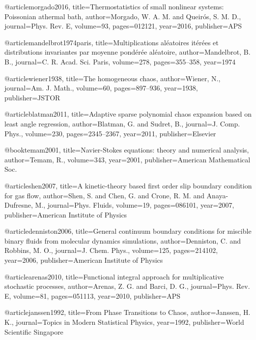 @article{morgado2016,
  title={{Thermostatistics of small nonlinear systems: Poissonian athermal bath}},
  author={Morgado, W. A. M. and Queir{\'o}s, S. M. D.},
  journal={Phys. Rev. E},
  volume={93},
  pages={012121},
  year={2016},
  publisher={APS}
}

@article{mandelbrot1974paris,
  title={Multiplications al{\'e}atoires it{\'e}r{\'e}es et distributions invariantes par moyenne pond{\'e}r{\'e}e al{\'e}atoire},
  author={Mandelbrot, B. B.},
  journal={C. R. Acad. Sci. Paris},
  volume={278},
  pages={355--358},
  year={1974}
}

@article{wiener1938,
  title={The homogeneous chaos},
  author={Wiener, N.},
  journal={Am. J. Math.},
  volume={60},
  pages={897--936},
  year={1938},
  publisher={JSTOR}
}

@article{blatman2011,
  title={Adaptive sparse polynomial chaos expansion based on least angle regression},
  author={Blatman, G. and Sudret, B.},
  journal={J. Comp. Phys.},
  volume={230},
  pages={2345--2367},
  year={2011},
  publisher={Elsevier}
}

@book{temam2001,
  title={Navier-Stokes equations: theory and numerical analysis},
  author={Temam, R.},
  volume={343},
  year={2001},
  publisher={American Mathematical Soc.}
}

@article{shen2007,
  title={A kinetic-theory based first order slip boundary condition for gas flow},
  author={Shen, S. and Chen, G. and Crone, R. M. and Anaya-Dufresne, M.},
  journal={Phys. Fluids},
  volume={19},
  pages={086101},
  year={2007},
  publisher={American Institute of Physics}
}

@article{denniston2006,
  title={General continuum boundary conditions for miscible binary fluids from molecular dynamics simulations},
  author={Denniston, C. and Robbins, M. O.},
  journal={J. Chem. Phys.},
  volume={125},
  pages={214102},
  year={2006},
  publisher={American Institute of Physics}
}

@article{arenas2010,
  title={Functional integral approach for multiplicative stochastic processes},
  author={Arenas, Z. G. and Barci, D. G.},
  journal={Phys. Rev. E},
  volume={81},
  pages={051113},
  year={2010},
  publisher={APS}
}

@article{janssen1992,
  title={From Phase Transitions to Chaos},
  author={Janssen, H. K.},
  journal={Topics in Modern Statistical Physics},
  year={1992},
  publisher={World Scientific Singapore}
}
